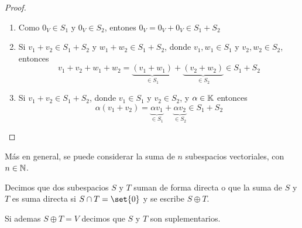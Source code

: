 \begin{proof}
	\begin{enumerate}
		\item Como \(0_V \in S_1\) y \(0_V \in S_2 \), entones \(0_V = 0_V + 0_V \in  S_1 + S_2 \)
		\item Si \(v_1 + v_2 \in S_1 + S_2 \) y \(w_1 + w_2 \in S_1 + S_2 \), donde \(v_1,w_1 \in S_1 \) y \(v_2, w_2 \in S_2 \), entonces
		      \[
			      v_1 + v_2 + w_1 + w_2 = \underbrace{(v_1 + w_1)}_{\in S_1} + \underbrace{(v_2 + w_2)}_{\in S_2} \in S_1 + S_2
		      \]
		\item Si \(v_1 + v_2 \in S_1 + S_2 \), donde \(v_1 \in S_1 \) y \(v_2 \in S_2 \), y \(\alpha \in \mathbb{K} \) entonces
		      \[
			      \alpha (v_1 + v_2) = \underbrace{\alpha v_1}_{\in S_1} + \underbrace{\alpha v_2}_{\in S_2} \in S_1 + S_2
		      \]
	\end{enumerate}
\end{proof}
Más en general, se puede considerar la suma de \(n \) subespacios vectoriales, con \(n \in \mathbb{N}\).
\begin{definition}
	Decimos que dos subespacios \(S \) y \(T \) suman de forma directa o que la suma de \(S \) y \(T \) es suma directa si \(S \cap T = \set{0 }\) y se escribe \(S \oplus T \).

	Si ademas \(S \oplus T = V \) decimos que \(S \) y \(T \) son suplementarios.
\end{definition}
